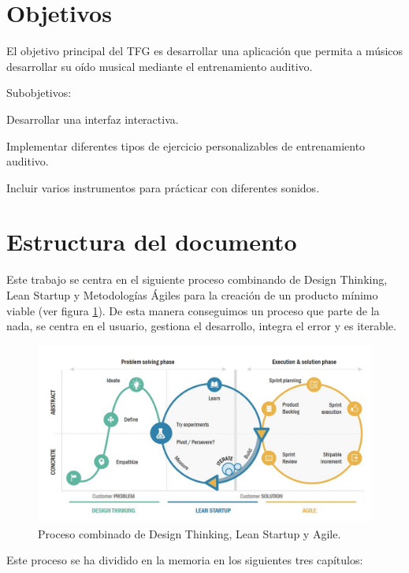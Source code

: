 \documentclass[12pt,twoside,titlepage]{report}
\begin{document}
\section{Objetivos}

El objetivo principal del TFG es desarrollar una aplicación que permita a músicos desarrollar su oído musical mediante el entrenamiento auditivo.

Subobjetivos:
\begin{compactitem}
    \item Desarrollar una interfaz interactiva.
    \item Implementar diferentes tipos de ejercicio personalizables de entrenamiento auditivo. 
    \item Incluir varios instrumentos para prácticar con diferentes sonidos.
\end{compactitem}

\section{Estructura del documento}

Este trabajo se centra en el siguiente proceso combinando de Design Thinking, Lean Startup y Metodologías Ágiles para la creación de un producto mínimo viable (ver figura \ref{fig:LeanDesignAgile}). De esta manera conseguimos un proceso que parte de la nada, se centra en el usuario, gestiona el desarrollo, integra el error y es iterable.

\begin{figure}[H] 
    \includegraphics[scale=0.46]{LeanDesignAgile}
    \centering
    \caption{Proceso combinado de Design Thinking, Lean Startup y Agile.}
    \label{fig:LeanDesignAgile}
\end{figure}

Este proceso se ha dividido en la memoria en los siguientes tres capítulos:
\end{document}
